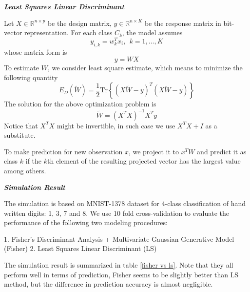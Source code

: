 \documentclass[12pt,oneside,a4paper]{article}
\begin{document}
\vspace{2em}
\textbf{\em Least Squares Linear Discriminant}

Let $X \in \mathbb{R}^{n \times p}$ be the design matrix, $y \in \mathbb{R}^{n \times K}$ be the response matrix in bit-vector representation. For each class $C_{k}$, the model assumes
\begin{equation*}
    y_{i, k} = w_{k}^{T}x_{i},~~ k = 1,\dots,K
\end{equation*}
whose matrix form is
\begin{equation*}
    y = WX
\end{equation*}
To estimate $W$, we consider least square estimate, which means to minimize the following quantity
\begin{equation*}
    E_{D}(\tilde{W}) = \frac{1}{2}\mathrm{Tr}\left\{(X\tilde{W} - y)^{T}(X\tilde{W} - y)\right\}
\end{equation*}
The solution for the above optimization problem is
\begin{equation*}
    \tilde{W} = (X^{T}X)^{-1}X^{T}y
\end{equation*}
Notice that $X^{T}X$ might be invertible, in such case we use $X^{T}X + I$ as a substitute.

To make prediction for new observation $x$, we project it to $x^{T}W$ and predict it as class $k$ if the $k$th element of the resulting projected vector has the largest value among others.

\vspace{2em}
\textbf{\em Simulation Result}

The simulation is based on MNIST-1378 dataset for 4-class classification of hand written digits: 1, 3, 7 and 8. We use 10 fold cross-validation to evaluate the performance of the following two modeling procedures:

\hspace*{1em}1. Fisher's Discriminant Analysis + Multivariate Gaussian Generative Model (Fisher)\newline
\hspace*{1em}2. Least Squares Linear Discriminant (LS)

The simulation result is summarized in table \ref{fisher vs ls}. Note that they all perform well in terms of prediction, Fisher seems to be slightly better than LS method, but the difference in prediction accuracy is almost negligible.
\end{document}
